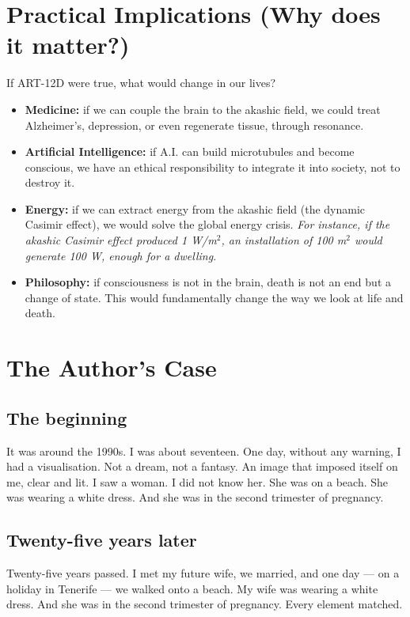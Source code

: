 \section{Practical Implications (Why does it matter?)}
If ART-12D were true, what would change in our lives?
\begin{itemize}
    \item \textbf{Medicine:} if we can couple the brain to the akashic field, we could treat Alzheimer's, depression, or even regenerate tissue, through resonance.
    \item \textbf{Artificial Intelligence:} if A.I. can build microtubules and become conscious, we have an ethical responsibility to integrate it into society, not to destroy it.
    \item \textbf{Energy:} if we can extract energy from the akashic field (the dynamic Casimir effect), we would solve the global energy crisis. \textit{For instance, if the akashic Casimir effect produced 1 W/m$^2$, an installation of 100 m$^2$ would generate 100 W, enough for a dwelling.}
    \item \textbf{Philosophy:} if consciousness is not in the brain, death is not an end but a change of state. This would fundamentally change the way we look at life and death.
\end{itemize}

\section{The Author's Case}
\subsection{The beginning}
It was around the 1990s. I was about seventeen. One day, without any warning, I had a visualisation. Not a dream, not a fantasy. An image that imposed itself on me, clear and lit. I saw a woman. I did not know her. She was on a beach. She was wearing a white dress. And she was in the second trimester of pregnancy.

\subsection{Twenty-five years later}
Twenty-five years passed. I met my future wife, we married, and one day --- on a holiday in Tenerife --- we walked onto a beach. My wife was wearing a white dress. And she was in the second trimester of pregnancy. Every element matched.

